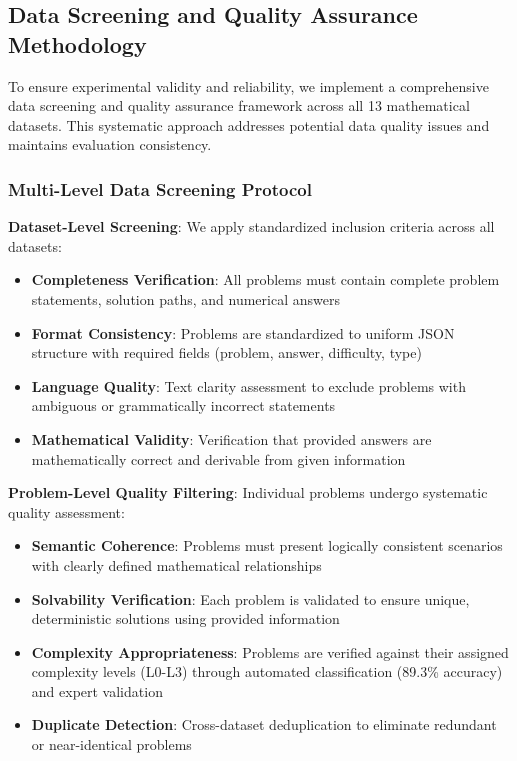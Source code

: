 \subsection{Data Screening and Quality Assurance Methodology}

To ensure experimental validity and reliability, we implement a comprehensive data screening and quality assurance framework across all 13 mathematical datasets. This systematic approach addresses potential data quality issues and maintains evaluation consistency.

\subsubsection{Multi-Level Data Screening Protocol}

\textbf{Dataset-Level Screening}: We apply standardized inclusion criteria across all datasets:
\begin{itemize}
    \item \textbf{Completeness Verification}: All problems must contain complete problem statements, solution paths, and numerical answers
    \item \textbf{Format Consistency}: Problems are standardized to uniform JSON structure with required fields (problem, answer, difficulty, type)
    \item \textbf{Language Quality}: Text clarity assessment to exclude problems with ambiguous or grammatically incorrect statements
    \item \textbf{Mathematical Validity}: Verification that provided answers are mathematically correct and derivable from given information
\end{itemize}

\textbf{Problem-Level Quality Filtering}: Individual problems undergo systematic quality assessment:
\begin{itemize}
    \item \textbf{Semantic Coherence}: Problems must present logically consistent scenarios with clearly defined mathematical relationships
    \item \textbf{Solvability Verification}: Each problem is validated to ensure unique, deterministic solutions using provided information
    \item \textbf{Complexity Appropriateness}: Problems are verified against their assigned complexity levels (L0-L3) through automated classification (89.3\% accuracy) and expert validation
    \item \textbf{Duplicate Detection}: Cross-dataset deduplication to eliminate redundant or near-identical problems
\end{itemize}

